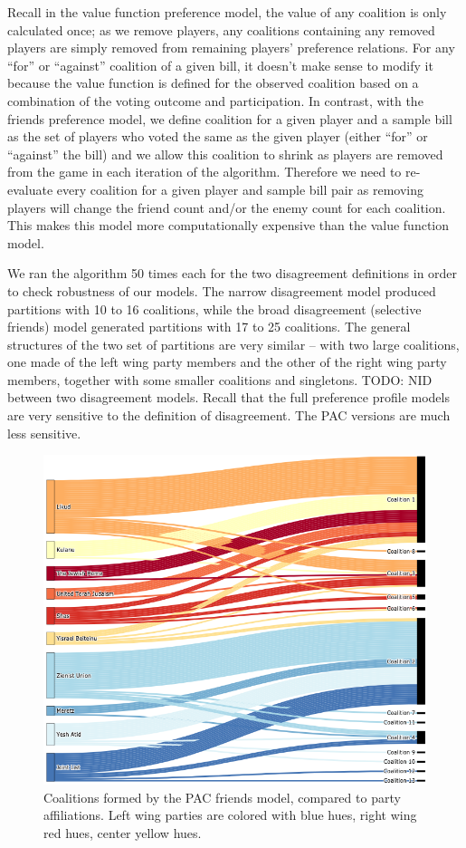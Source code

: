 \documentclass[letterpaper]{article} %
\begin{document}
Recall in the value function preference model, the value of any coalition is only calculated once; as we remove players, any coalitions containing any removed players are simply removed from remaining players' preference relations. For any ``for'' or ``against'' coalition of a given bill, it doesn't make sense to modify it because the value function is defined for the observed coalition based on a combination of the voting outcome and participation. In contrast, with the friends preference model, we define coalition for a given player and a sample bill as the set of players who voted the same as the given player (either ``for'' or ``against'' the bill) and we allow this coalition to shrink as players are removed from the game in each iteration of the algorithm. Therefore we need to re-evaluate every coalition for a given player and sample bill pair as removing players will change the friend count and/or the enemy count for each coalition. This makes this model more computationally expensive than the value function model.

We ran the algorithm 50 times each for the two disagreement definitions in order to check robustness of our models. The narrow disagreement model produced partitions with 10 to 16 coalitions, while the broad disagreement (selective friends) model generated partitions with 17 to 25 coalitions. The general structures of the two set of partitions are very similar – with two large coalitions, one made of the left wing party members and the other of the right wing party members, together with some smaller coalitions and singletons. TODO: NID between two disagreement models. Recall that the full preference profile models are very sensitive to the definition of disagreement. The PAC versions are much less sensitive.

\begin{figure}[htb]
\includegraphics[width=\columnwidth]{pac_friends}
\caption{Coalitions formed by the PAC friends model, compared to party affiliations. Left wing parties are colored with blue hues, right wing red hues, center yellow hues.}
\end{figure}
\end{document}
